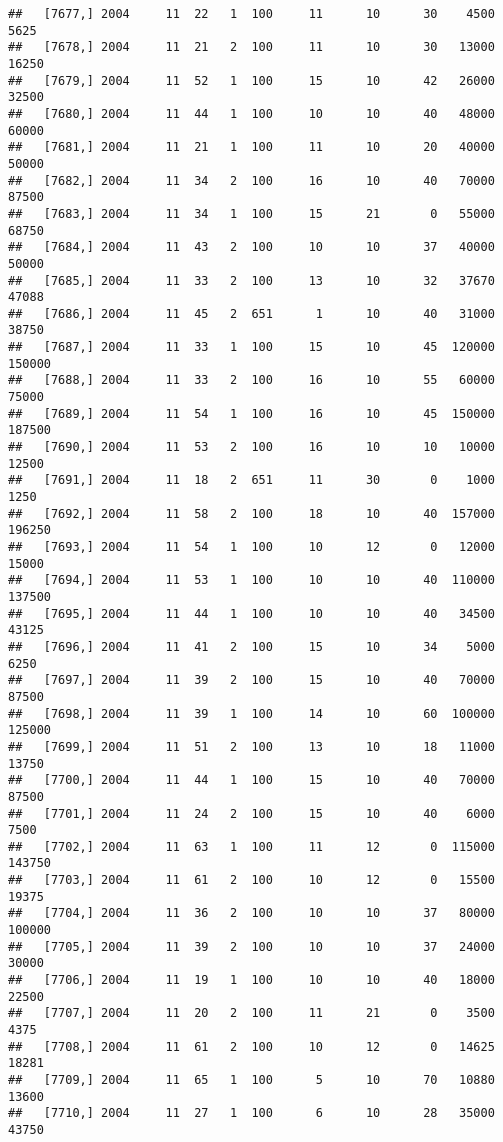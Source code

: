\documentclass{article}\usepackage[]{graphicx}\usepackage[]{color}
\makeatletter
\newenvironment{kframe}{%
 \def\at@end@of@kframe{}%
 \ifinner\ifhmode%
  \def\at@end@of@kframe{\end{minipage}}%
  \begin{minipage}{\columnwidth}%
 \fi\fi%
 \def\FrameCommand##1{\hskip\@totalleftmargin \hskip-\fboxsep
 \colorbox{shadecolor}{##1}\hskip-\fboxsep
     \hskip-\linewidth \hskip-\@totalleftmargin \hskip\columnwidth}%
 \MakeFramed {\advance\hsize-\width
   \@totalleftmargin\z@ \linewidth\hsize
   \@setminipage}}%
 {\par\unskip\endMakeFramed%
 \at@end@of@kframe}
\newenvironment{knitrout}{}{} %
\makeatother
\begin{document}
\begin{knitrout}
\begin{kframe}
\begin{verbatim}
##   [7677,] 2004     11  22   1  100     11      10      30    4500    5625
##   [7678,] 2004     11  21   2  100     11      10      30   13000   16250
##   [7679,] 2004     11  52   1  100     15      10      42   26000   32500
##   [7680,] 2004     11  44   1  100     10      10      40   48000   60000
##   [7681,] 2004     11  21   1  100     11      10      20   40000   50000
##   [7682,] 2004     11  34   2  100     16      10      40   70000   87500
##   [7683,] 2004     11  34   1  100     15      21       0   55000   68750
##   [7684,] 2004     11  43   2  100     10      10      37   40000   50000
##   [7685,] 2004     11  33   2  100     13      10      32   37670   47088
##   [7686,] 2004     11  45   2  651      1      10      40   31000   38750
##   [7687,] 2004     11  33   1  100     15      10      45  120000  150000
##   [7688,] 2004     11  33   2  100     16      10      55   60000   75000
##   [7689,] 2004     11  54   1  100     16      10      45  150000  187500
##   [7690,] 2004     11  53   2  100     16      10      10   10000   12500
##   [7691,] 2004     11  18   2  651     11      30       0    1000    1250
##   [7692,] 2004     11  58   2  100     18      10      40  157000  196250
##   [7693,] 2004     11  54   1  100     10      12       0   12000   15000
##   [7694,] 2004     11  53   1  100     10      10      40  110000  137500
##   [7695,] 2004     11  44   1  100     10      10      40   34500   43125
##   [7696,] 2004     11  41   2  100     15      10      34    5000    6250
##   [7697,] 2004     11  39   2  100     15      10      40   70000   87500
##   [7698,] 2004     11  39   1  100     14      10      60  100000  125000
##   [7699,] 2004     11  51   2  100     13      10      18   11000   13750
##   [7700,] 2004     11  44   1  100     15      10      40   70000   87500
##   [7701,] 2004     11  24   2  100     15      10      40    6000    7500
##   [7702,] 2004     11  63   1  100     11      12       0  115000  143750
##   [7703,] 2004     11  61   2  100     10      12       0   15500   19375
##   [7704,] 2004     11  36   2  100     10      10      37   80000  100000
##   [7705,] 2004     11  39   2  100     10      10      37   24000   30000
##   [7706,] 2004     11  19   1  100     10      10      40   18000   22500
##   [7707,] 2004     11  20   2  100     11      21       0    3500    4375
##   [7708,] 2004     11  61   2  100     10      12       0   14625   18281
##   [7709,] 2004     11  65   1  100      5      10      70   10880   13600
##   [7710,] 2004     11  27   1  100      6      10      28   35000   43750

\end{verbatim}
\end{kframe}
\end{knitrout}
\end{document}
